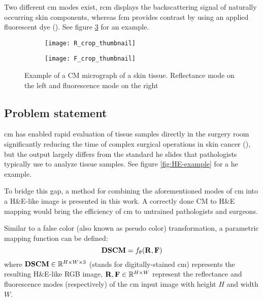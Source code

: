 \documentclass[../main.tex]{subfiles}
\begin{document}
Two different \gls{cm} modes exist, \gls{rcm} displays the backscattering signal
of naturally occurring skin components, whereas \gls{fcm} provides contrast
by using an applied fluorescent dye (\cite{Skvara2012}).
See figure \ref{fig:CM-example} for an example.

\begin{figure}[h]
\centering
\begin{subfigure}{.5\textwidth}
  \centering
  \texttt{[image: R\_crop\_thumbnail]}
  \label{fig:R-example}
\end{subfigure}%
\begin{subfigure}{.5\textwidth}
  \centering
  \texttt{[image: F\_crop\_thumbnail]}
  \label{fig:F-example}
\end{subfigure}
\caption{Example of a CM micrograph of a skin tissue.
Reflectance mode on the left and fluorescence mode on the right}
\label{fig:CM-example}
\end{figure}

\subsection{Problem statement}
\label{sec:problem-statement}
\gls{cm} has enabled rapid evaluation of tissue samples
directly in the surgery room significantly reducing the time of complex
surgical operations in skin cancer (\cite{Cinotti2018}),
but the output largely differs from the standard \gls{he} slides that
pathologists typically use to analyze tissue samples.
See figure \ref{fig:HE-example} for a \gls{he} example.

To bridge this gap, a method for combining the aforementioned modes of
\gls{cm} into a H\&E-like image is presented in this work.
A correctly done CM to H\&E mapping would bring the efficiency of \gls{cm}
to untrained pathologists and surgeons.

Similar to a false color (also known as pseudo color) transformation,
a parametric mapping function can be defined:
\begin{equation} \label{eq:mapping-function}
	\mathbf{DSCM}
	= f_{\theta}(\mathbf{R}, \mathbf{F})
\end{equation}
where $\mathbf{DSCM} \in \mathbb{R}{}^{H \times W \times 3}$ (stands for digitally-stained
\gls{cm}) represents the resulting H\&E-like RGB image,
$\mathbf{R}, \mathbf{F} \in \mathbb{R}{}^{H \times W}$
represent the reflectance and fluorescence modes (respectively) of the \gls{cm} input
image with height $H$ and width $W$.
\end{document}
